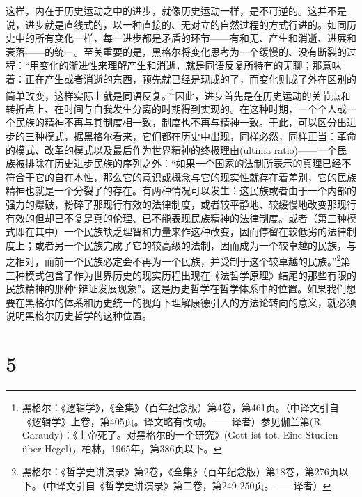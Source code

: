 这样，内在于历史运动之中的进步，就像历史运动一样，是不可逆的。这并不是说，进步就是直线式的，以一种直接的、无对立的自然过程的方式行进的。如同历史中的所有变化一样，每一进步都是矛盾的环节——有和无、产生和消逝、进展和衰落——的统一。至关重要的是，黑格尔将变化思考为一个缓慢的、没有断裂的过程：“用变化的渐进性来理解产生和消逝，就是同语反复所特有的无聊；那意味着：正在产生或者消逝的东西，预先就已经是现成的了，而变化则成了外在区别的简单改变，这样实际上就是同语反复。”\footnote{黑格尔：《逻辑学》，《全集》（百年纪念版）第4卷，第461页。（中译文引自《逻辑学》上卷，第405页。译文略有改动。——译者）参见伽兰第(R. Garaudy)：《上帝死了。对黑格尔的一个研究》(Gott ist tot. Eine Studien über Hegel)，柏林，1965年，第386页以下。}因此，进步首先是在历史运动的关节点和转折点上、在时间与自我发生分离的时期得到实现的。在这种时期，一个个人或一个民族的精神不再与其制度相一致，制度也不再与精神一致。于此，可以区分出进步的三种模式，据黑格尔看来，它们都在历史中出现，同样必然，同样正当：革命的模式、改革的模式以及最后作为世界精神的终极理由(ultima ratio)——一个民族被排除在历史进步民族的序列之外：“如果一个国家的法制所表示的真理已经不符合于它的自在本性，那么它的意识或概念与它的现实性就存在着差别，它的民族精神也就是一个分裂了的存在。有两种情况可以发生：这民族或者由于一个内部的强力的爆破，粉碎了那现行有效的法律制度，或者较平静地、较缓慢地改变那现行有效的但却已不复是真的伦理、已不能表现民族精神的法律制度。或者（第三种模式即在其中）一个民族缺乏理智和力量来作这种改变，因而停留在较低劣的法律制度上；或者另一个民族完成了它的较高级的法制，因而成为一个较卓越的民族，与之相对，而前一个民族必定会不再为一个民族，并受制于这个较卓越的民族。”\footnote{黑格尔：《哲学史讲演录》第2卷，《全集》（百年纪念版）第18卷，第276页以下。（中译文引自《哲学史讲演录》第二卷，第249-250页。——译者）}第三种模式包含了作为世界历史的现实历程出现在《法哲学原理》结尾的那些有限的民族精神的那种“辩证发展现象”。这是历史哲学在哲学体系中的位置。如果我们想要在黑格尔的体系和历史统一的视角下理解康德引入的方法论转向的意义，就必须说明黑格尔历史哲学的这种位置。

\section*{5}


